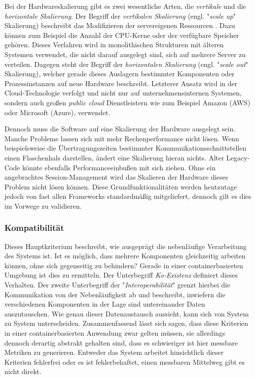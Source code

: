 Bei der Hardwareskalierung gibt es zwei wesentliche Arten, die \emph{vertikale} und die \emph{horizontale Skalierung}. Der Begriff der \emph{vertikalen Skalierung} (engl. "\emph{scale up}" Skalierung) beschreibt das Modifizieren der servereigenen Ressourcen \cite[Absatz \emph{Scalability}]{nfr-dotnetcurry}. Dazu können zum Beispiel die Anzahl der CPU-Kerne oder der verfügbare Speicher gehören. Dieses Verfahren wird in monolithischen Strukturen mit älteren Systemen verwendet, die nicht darauf ausgelegt sind, sich auf mehrere Server zu verteilen. Dagegen steht der Begriff der \emph{horizontalen Skalierung} (engl. "\emph{scale out}" Skalierung), welcher gerade dieses Auslagern bestimmter Komponenten oder Prozessinstanzen auf neue Hardware beschreibt. Letzterer Ansatz wird in der Cloud-Technologie verfolgt und nicht nur auf unternehmensinternen Systemen, sondern auch großen \emph{public cloud} Dienstleistern wie zum Beispiel Amazon (AWS) oder Microsoft (Azure), verwendet.

Dennoch muss die Software auf eine Skalierung der Hardware ausgelegt sein. Manche Probleme lassen sich mit mehr Rechenperformance nicht lösen. Wenn beispielsweise die Übertragungszeiten bestimmter Kommunikationsschnittstellen einen Flaschenhals darstellen, ändert eine Skalierung hieran nichts. Alter Legacy-Code könnte ebenfalls Performanceeinbußen mit sich ziehen. Ohne ein angebrachtes Session-Management wird das Skalieren der Hardware dieses Problem nicht lösen können. Diese Grundfunktionalitäten werden heutzutage jedoch von fast allen Frameworks standardmäßig mitgeliefert, dennoch gilt es dies im Vorwege zu validieren. 


\subsubsection{Kompatibilität}
\label{ss:kompatabilitaet}
Dieses Hauptkriterium beschreibt, wie ausgeprägt die nebenläufige Verarbeitung des Systems ist. Ist es möglich, dass mehrere Komponenten gleichzeitig arbeiten können, ohne sich gegenseitig zu behindern? Gerade in einer containerbasierten Umgebung ist dies zu ermitteln. Der Unterbegriff \emph{Ko-Existenz} definiert dieses Verhalten. Der zweite Unterbegriff der "\emph{Interoperabilität}" grenzt hierbei die Kommunikation von der Nebenläufigkeit ab und beschreibt, inwiefern die verschiedenen Komponenten in der Lage sind untereinander Daten auszutauschen. Wie genau dieser Datenaustausch aussieht, kann sich von System zu System unterscheiden. Zusammenfassend lässt sich sagen, dass diese Kriterien in einer containerbasierten Anwendung zwar gelten müssen, sie allerdings dennoch derartig abstrakt gehalten sind, dass es schwieriger ist hier messbare Metriken zu generieren. Entweder das System arbeitet hinsichtlich dieser Kriterien fehlerfrei oder es ist fehlerbehaftet, einen messbaren Mittelweg gibt es nicht direkt.


